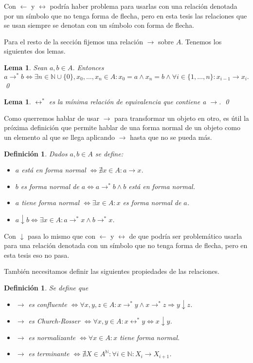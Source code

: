 \documentclass[12pt]{report}
\theoremstyle{customstyle}
\newtheorem{definition}[theorem]{Definición}
\newtheorem{lemma}[theorem]{Lema}
\theoremstyle{factstyle}
\begin{document}
Con $←$ y $↔$ podría haber problema para usarlas con una relación denotada por un símbolo que no tenga forma de flecha, pero en esta tesis las relaciones que se usan siempre se denotan con un símbolo con forma de flecha.

Para el resto de la sección fijemos una relación $→$ sobre $A$. Tenemos los siguientes dos lemas.

\begin{lemma}\label{lemma:→* como ∃}
  Sean $a, b ∈ A$. Entonces
  \[ a →^* b ⇔ ∃n ∈ ℕ ∪ \{0\}, x_0, …, x_n ∈ A : x_0 = a ∧ x_n = b ∧ ∀i ∈ \{1, …, n\} : x_{i-1} → x_i \text{.}\]
  \qed
\end{lemma}

\begin{lemma}\label{lemma:↔* min equiv que contiene a →}
  $↔^*$ es la mínima relación de equivalencia que contiene a $→$.
  \qed
\end{lemma}

Como querremos hablar de usar $→$ para transformar un objeto en otro, es útil la próxima definición que permite hablar de una forma normal de un objeto como un elemento al que se llega aplicando $→$ hasta que no se pueda más.

\begin{definition}\label{def:forma normal}
  Dados $a, b ∈ A$ se define:
  \begin{itemize}
    \item $a$ está en forma normal $⇔ ∄x ∈ A : a → x$.
    \item $b$ es forma normal de $a ⇔ a →^* b ∧ b$ está en forma normal.
    \item $a$ tiene forma normal $⇔ ∃x ∈ A : x$ es forma normal de $a$.
    \item $a ↓ b ⇔ ∃x ∈ A : a →^* x ∧ b →^* x$.
  \end{itemize}
\end{definition}

Con $↓$ pasa lo mismo que con $←$ y $↔$ de que podría ser problemático usarla para una relación denotada con un símbolo que no tenga forma de flecha, pero en esta tesis eso no pasa.

También necesitamos definir las siguientes propiedades de las relaciones.

\begin{definition} Se define que
  \begin{itemize}
    \item $→$ es confluente $⇔ ∀x, y, z ∈ A : x →^* y ∧ x →^* z ⇒ y ↓ z$.
    \item $→$ es Church-Rosser $⇔ ∀x, y ∈ A : x ↔^* y ⇔ x ↓ y$.
    \item $→$ es normalizante $⇔ ∀x ∈ A : x$ tiene forma normal.
    \item $→$ es terminante $⇔ ∄X ∈ A^ℕ : ∀i ∈ ℕ : X_i → X_{i + 1}$.
  \end{itemize}
\end{definition}
\end{document}
